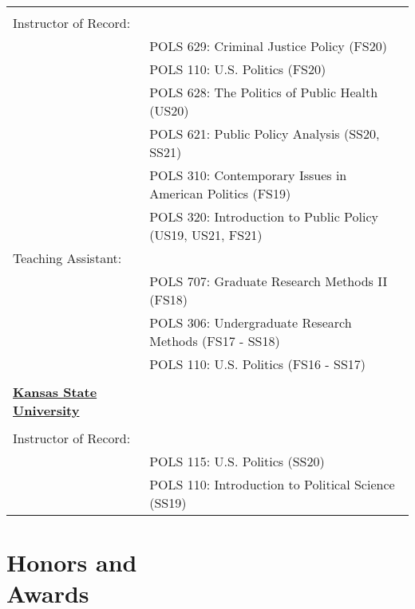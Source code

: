 \documentclass[margin,line,pifont,palatino,courier]{res}
\begin{document}
\begin{resume}
\begin{tabular}{ll}
  & \tabularnewline
    Instructor of Record: & \tabularnewline
  & POLS 629: Criminal Justice Policy (FS20)\tabularnewline
  & POLS 110: U.S. Politics (FS20)\tabularnewline
  & POLS 628: The Politics of Public Health (US20)\tabularnewline
  & POLS 621: Public Policy Analysis (SS20, SS21)\tabularnewline
  & POLS 310: Contemporary Issues in American Politics (FS19)\tabularnewline
  & POLS 320: Introduction to Public Policy (US19, US21, FS21)\tabularnewline
    Teaching Assistant: & \tabularnewline
  & POLS 707: Graduate Research Methods II (FS18)\tabularnewline
  & POLS 306: Undergraduate Research Methods (FS17 - SS18)\tabularnewline
  & POLS 110: U.S. Politics (FS16 - SS17)\tabularnewline
  & \tabularnewline
    \textbf{\underline{Kansas State University}} & \tabularnewline
  & \tabularnewline
    Instructor of Record: & \tabularnewline
  & POLS 115: U.S. Politics (SS20)\tabularnewline
  & POLS 110: Introduction to Political Science (SS19)\tabularnewline
\end{tabular}


\section{\sc Honors and\\ Awards}


\end{resume}
\end{document}
